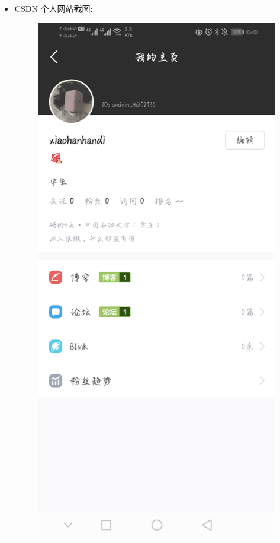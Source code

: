 \documentclass{article}
\begin{document}
\begin{itemize}
    
    \newpage
    \item CSDN 个人网站截图:\par
    \begin{figure}[h!]
    	\centering
    	\includegraphics[scale=0.1]{s}
    	\caption{}
    	\label{fig:y}
    \end{figure}
    

\end{itemize}
\end{document}
